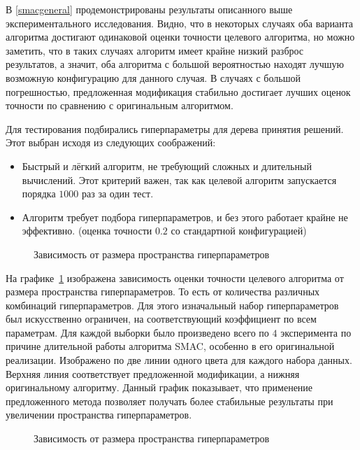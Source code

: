 В \cref{smacgeneral} продемонстрированы результаты описанного выше
экспериментального исследования. Видно, что в некоторых случаях оба варианта
алгоритма достигают одинаковой оценки точности целевого алгоритма, но можно
заметить, что в таких случаях алгоритм имеет крайне низкий разброс результатов,
а значит, оба алгоритма с большой вероятностью находят лучшую возможную
конфигурацию для данного случая. В случаях с большой погрешностью, предложенная
модификация стабильно достигает лучших оценок точности по сравнению
с оригинальным алгоритмом.

Для тестирования подбирались гиперпараметры для дерева принятия решений. Этот
выбран исходя из следующих соображений:

\begin{itemize}
    \item Быстрый и лёгкий алгоритм, не требующий сложных и длительный вычислений.
    Этот критерий важен, так как целевой алгоритм запускается порядка $1000$ раз за один тест.
    \item Алгоритм требует подбора гиперпараметров, и без этого работает крайне
    не эффективно. (оценка точности $0.2$ со стандартной конфигурацией)
\end{itemize}

\begin{figure}[H]
\caption{Зависимость от размера пространства гиперпараметров}\label{smac_size}
\end{figure}

На графике~\cref{smac_size} изображена зависимость оценки точности целевого
алгоритма от размера пространства гиперпараметров. То есть от количества
различных комбинаций гиперпараметров. Для этого изначальный набор
гиперпараметров был искусственно ограничен, на соответствующий коэффициент по
всем параметрам. Для каждой выборки было произведено всего по $4$ эксперимента по
причине длительной работы алгоритма SMAC, особенно в его оригинальной
реализации. Изображено по две линии одного цвета для каждого набора данных.
Верхняя линия соответствует предложенной модификации, а нижняя оригинальному
алгоритму. Данный график показывает, что применение предложенного метода
позволяет получать более стабильные результаты при увеличении пространства
гиперпараметров.

\begin{figure}[H]
\caption{Зависимость от размера пространства гиперпараметров}\label{smac_count}
\end{figure}

